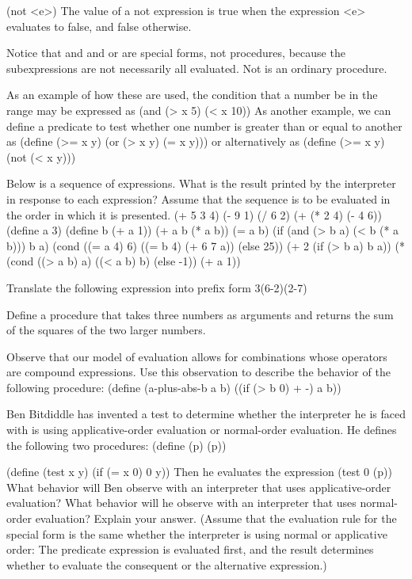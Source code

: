 \startcode
(not <e>)
\stopcode
The value of a not expression is true when the expression <e> evaluates to false, and false otherwise.

Notice that and and or are special forms, not procedures,
because the subexpressions are not necessarily all evaluated. Not is an ordinary procedure.

As an example of how these are used,
the condition that a number  be in the range  may be expressed as
\startcode
(and (> x 5) (< x 10))
\stopcode
As another example, we can define a predicate to test whether one number is greater than or equal to another as
\startcode
(define (>= x y)
  (or (> x y) (= x y)))
\stopcode
or alternatively as
\startcode
(define (>= x y)
  (not (< x y)))
\stopcode

\beginexercise
Below is a sequence of expressions.
What is the result printed by the interpreter in response to each expression?
Assume that the sequence is to be evaluated in the order in which it is presented.
(+ 5 3 4)
(- 9 1)
(/ 6 2)
(+ (* 2 4) (- 4 6))
(define a 3)
(define b (+ a 1))
(+ a b (* a b))
(= a b)
(if (and (> b a) (< b (* a b)))
    b
    a)
(cond ((= a 4) 6)
      ((= b 4) (+ 6 7 a))
      (else 25))
(+ 2 (if (> b a) b a))
(* (cond ((> a b) a)
         ((< a b) b)
         (else -1))
   (+ a 1))
\stopcode
\endexercise

\beginexercise
Translate the following expression into prefix form
\startformula
        {3(6-2)(2-7)}
\stopformula
\endexercise

\beginexercise
Define a procedure that takes three numbers as arguments and returns the sum of the squares of the two larger numbers.
\endexercise

\beginexercise
Observe that our model of evaluation allows for combinations whose operators are compound expressions.
Use this observation to describe the behavior of the following procedure:
\startcode
(define (a-plus-abs-b a b)
  ((if (> b 0) + -) a b))
\stopcode
\endexercise

\beginexercise
Ben Bitdiddle has invented a test to determine
whether the interpreter he is faced with is using applicative-order evaluation or normal-order evaluation.
He defines the following two procedures:
\startcode
(define (p) (p))

(define (test x y)
  (if (= x 0)
      0
      y))
\stopcode
Then he evaluates the expression
\startcode
(test 0 (p))
\stopcode
What behavior will Ben observe with an interpreter that uses applicative-order evaluation?
What behavior will he observe with an interpreter that uses normal-order evaluation?
Explain your answer.
(Assume that the evaluation rule for the special form  is the same
whether the interpreter is using normal or applicative order:
The predicate expression is evaluated first,
and the result determines whether to evaluate the consequent or the alternative expression.)
\endexercise

